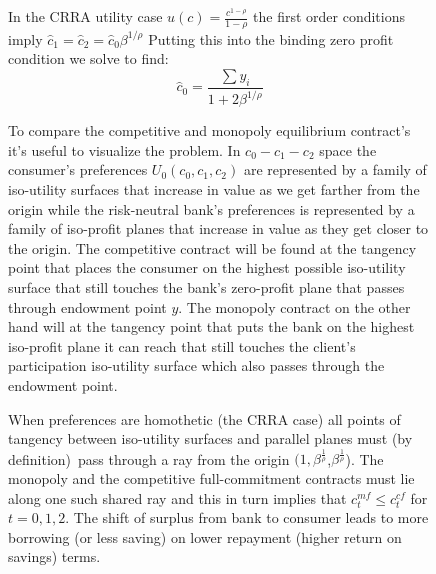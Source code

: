 \documentclass[11pt]{article}%
\begin{document}
\begin{figure}
{In the CRRA utility case $u(c)=\frac{c^{1-\rho }}{1-\rho }$ the first order conditions imply  \(\hat{c}_{1}=\hat{c}_{2}{}= \hat{c}_{0}\beta^{1/\rho}\)    Putting this into the binding zero profit condition we solve to find: \begin{displaymath}
\hat{c}_{0} =\frac{\sum y_{i}}{1+2\beta^{1/\rho}}
\end{displaymath}
 

To compare the competitive and  monopoly equilibrium contract's it's useful to visualize the problem.  In $c_{0}-c_{1}-c_{2}$ space  the consumer's preferences \(U_{0}(c_{0},c_{1},c_{2})\)  are represented by a family of iso-utility surfaces
that increase in value as we get farther from the origin while the risk-neutral bank's preferences is represented by a family of iso-profit planes that increase in value as they get closer to the origin. The competitive contract will be found at the tangency point   that places  the consumer on the highest possible iso-utility surface that still touches the bank's zero-profit plane that  passes through  endowment point \(y. \) The monopoly contract on the other hand will at the tangency point that puts the bank on the highest iso-profit plane it can reach that  still touches the client's participation iso-utility surface which also passes through the endowment point. 



When preferences are homothetic (the CRRA case)
all points of tangency between iso-utility surfaces and parallel planes must (by definition)\ pass through a ray from the origin \((1,\beta^{\frac{1}{\rho}}\),\(\beta^{\frac{1}{\rho}}\)). The monopoly and the competitive full-commitment contracts must lie along one such shared ray and this in turn implies that \(c^{mf}_{t} \leq c^{cf}_{t}\) for \(t=0,1,2  \). The shift of surplus from bank to consumer leads to more borrowing  (or less saving)
on lower repayment (higher return on savings) terms.

\begin{figure}[ptb]
\centering
{}


\end{figure}}
\end{figure}
\end{document}
